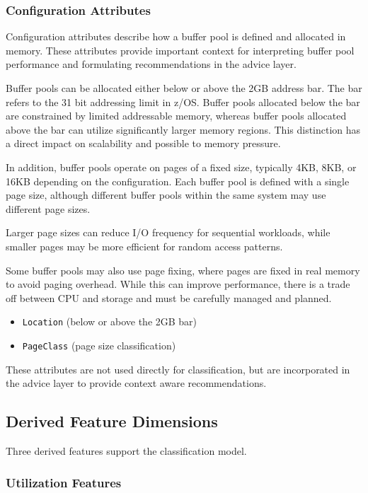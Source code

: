 \subsubsection{Configuration Attributes}

Configuration attributes describe how a buffer pool is defined and allocated in memory. These attributes provide important context for interpreting buffer pool performance and formulating recommendations in the advice layer.

Buffer pools can be allocated either below or above the 2GB address bar. The bar refers to the 31 bit addressing limit in z/OS. Buffer pools allocated below the bar are constrained by limited addressable memory, whereas buffer pools allocated above the bar can utilize significantly larger memory regions. This distinction has a direct impact on scalability and possible to memory pressure.

In addition, buffer pools operate on pages of a fixed size, typically 4KB, 8KB, or 16KB depending on the configuration. Each buffer pool is defined with a single page size, although different buffer pools within the same system may use different page sizes.

Larger page sizes can reduce I/O frequency for sequential workloads, while smaller pages may be more efficient for random access patterns.

Some buffer pools may also use page fixing, where pages are fixed in real memory to avoid paging overhead. While this can improve performance, there is a trade off between CPU and storage and must be carefully managed and planned.

\begin{itemize}
    \item \texttt{Location} (below or above the 2GB bar)
    \item \texttt{PageClass} (page size classification)
\end{itemize}

These attributes are not used directly for classification, but are incorporated in the advice layer to provide context aware recommendations.

\subsection{Derived Feature Dimensions}

Three derived features support the classification model.

\subsubsection{Utilization Features}

